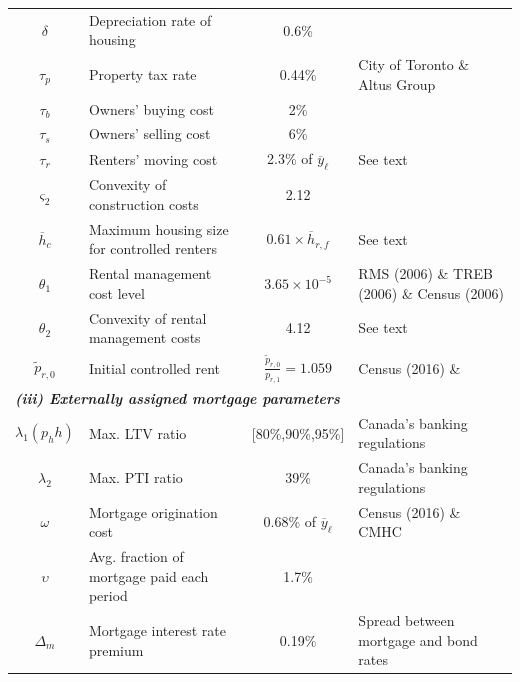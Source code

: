 \begin{center}
\begin{tabular}{clcl}
$\delta$ & Depreciation rate of housing & 0.6\% & \citet{rosenthal-2014} \\
$\tau_p$ & Property tax rate & 0.44\% & City of Toronto \& Altus Group \\
$\tau_{b}$ & Owners' buying cost & 2\% & \citet{gm-2003} \\
$\tau_{s}$ & Owners' selling cost & 6\% & \citet{gm-2003} \\
$\tau_{r}$ & Renters' moving cost & 2.3\% of $\overline{y}_{\ell}$ & See text \\
$\varsigma_2$ & Convexity of construction costs & 2.12 & \citet{piaxao-2021} \\
$\overline{h}_{c}$ & Maximum housing size for controlled renters & $0.61\times \overline{h}_{r,f}$ & See text \\
$\theta_1$ & Rental management cost level & $3.65\times 10^{-5}$ & RMS (2006) \& TREB (2006) \& Census (2006) \\
$\theta_2$ & Convexity of rental management costs & 4.12 & See text \\
$\tilde{p}_{r,0}$ & Initial controlled rent & $\frac{\tilde{p}_{r,0}}{p_{r,1}}=1.059$ & Census (2016) \& \citet{zhang-gou} \\ 
\midrule
\multicolumn{4}{l}{\textit{\textbf{(iii) Externally assigned mortgage parameters}}}\\
\midrule
$\lambda_{1}(p_h h)$ & Max. LTV ratio & [80\%,90\%,95\%] & Canada's banking regulations \\
$\lambda_{2}$ & Max. PTI ratio & 39\% & Canada's banking regulations \\
$\omega$ & Mortgage origination cost & 0.68\% of $\overline{y}_{\ell}$ & Census (2016) \& CMHC \\
$\upsilon$ & Avg. fraction of mortgage paid each period & 1.7\% & \citet{kkk-2021} \\
$\Delta_{m}$ & Mortgage interest rate premium & 0.19\% & Spread between mortgage and bond rates \\
\bottomrule
\end{tabular}
\end{center}
\normalsize
